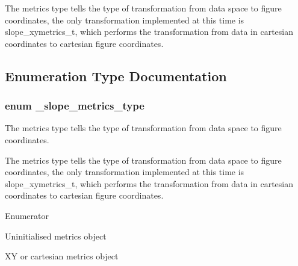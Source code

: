 The metrics type tells the type of transformation from data space to figure coordinates, the only transformation implemented at this time is slope\+\_\+xymetrics\+\_\+t, which performs the transformation from data in cartesian coordinates to cartesian figure coordinates. 

\subsection{Enumeration Type Documentation}
\hypertarget{group__Metrics_gafd1cecb864b09319525ee096fc692dd4}{
\subsubsection[{\+\_\+slope\+\_\+metrics\+\_\+type}]{\setlength{\rightskip}{0pt plus 5cm}enum {\bf \+\_\+slope\+\_\+metrics\+\_\+type}}}\label{group__Metrics_gafd1cecb864b09319525ee096fc692dd4}


The metrics type tells the type of transformation from data space to figure coordinates. 

The metrics type tells the type of transformation from data space to figure coordinates, the only transformation implemented at this time is slope\+\_\+xymetrics\+\_\+t, which performs the transformation from data in cartesian coordinates to cartesian figure coordinates. \begin{Desc}
\item[Enumerator]\par
\begin{description}
\item[{\em 
\hypertarget{group__Metrics_ggafd1cecb864b09319525ee096fc692dd4ad8bd15dd877a322c323826524fad1d7b}{S\+L\+O\+P\+E\+\_\+\+M\+E\+T\+R\+I\+C\+S\+\_\+\+I\+N\+V\+A\+L\+I\+D}\label{group__Metrics_ggafd1cecb864b09319525ee096fc692dd4ad8bd15dd877a322c323826524fad1d7b}
}]Uninitialised metrics object \item[{\em 
\hypertarget{group__Metrics_ggafd1cecb864b09319525ee096fc692dd4a8054bd0c50ca93d0b3222b70b1284c37}{S\+L\+O\+P\+E\+\_\+\+X\+Y\+M\+E\+T\+R\+I\+C\+S}\label{group__Metrics_ggafd1cecb864b09319525ee096fc692dd4a8054bd0c50ca93d0b3222b70b1284c37}
}]X\+Y or cartesian metrics object \end{description}
\end{Desc}


